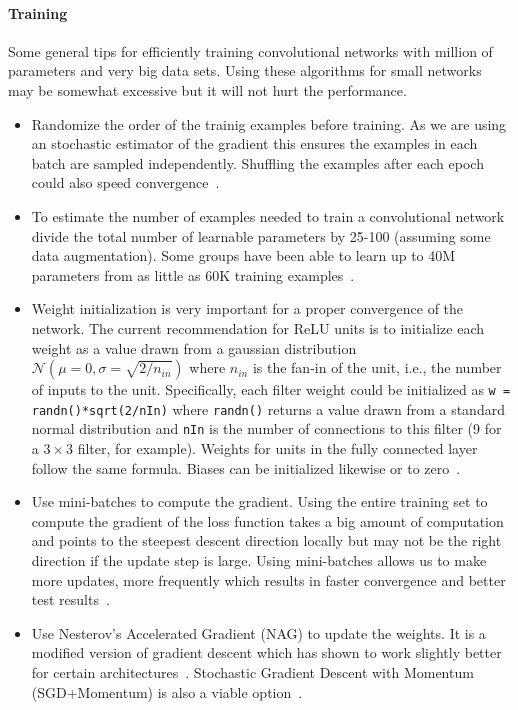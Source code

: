 \paragraph{Training}
Some general tips for efficiently training convolutional networks with million of parameters and very big data sets. Using these algorithms for small networks may be somewhat excessive but it will not hurt the performance.

\begin{itemize}
	\item Randomize the order of the trainig examples before training. As we are using an stochastic estimator of the gradient this ensures the examples in each batch are sampled independently. Shuffling the examples after each epoch could also speed convergence~\cite{Bengio2012}.

	\item To estimate the number of examples needed to train a convolutional network divide the total number of learnable parameters by 25-100 (assuming some data augmentation). Some groups have been able to learn up to 40M parameters from as little as 60K training examples~\cite{Dieleman2015, Springenberg2014}.

	\item Weight initialization is very important for a proper convergence of the network. The current recommendation for ReLU units is to initialize each weight as a value drawn from a gaussian distribution $\mathcal{N}(\mu = 0, \sigma = \sqrt{2/n_{in}})$ where $n_{in}$ is the fan-in of the unit, i.e., the number of inputs to the unit. Specifically, each filter weight could be initialized as \texttt{w = randn()*sqrt(2/nIn)} where \texttt{randn()} returns a value drawn from a standard normal distribution and \texttt{nIn} is the number of connections to this filter (9 for a $3\times 3$ filter, for example). Weights for units in the fully connected layer follow the same formula. Biases can be initialized likewise or to zero~\cite{He2015}.

	\item Use mini-batches to compute the gradient. Using the entire training set to compute the gradient of the loss function takes a big amount of computation and points to the steepest descent direction locally but may not be the right direction if the update step is large. Using mini-batches allows us to make more updates, more frequently which results in faster convergence and better test results~\cite{Bengio2012}.

	\item Use Nesterov's Accelerated Gradient (NAG) to update the weights. It is a modified version of gradient descent which has shown to work slightly better for certain architectures~\cite{Bengio2012b}. Stochastic Gradient Descent with Momentum (SGD+Momentum) is also a viable option~\cite{Karpathy2015}.


\end{itemize}

